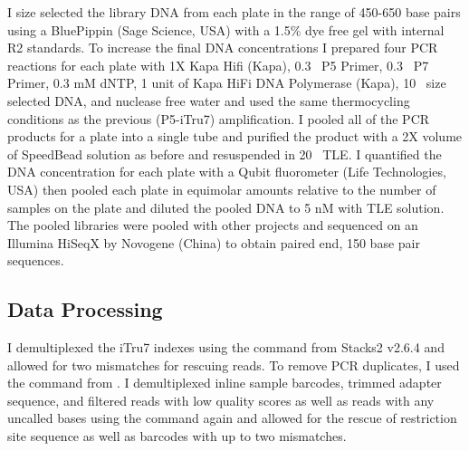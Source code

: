 I size selected the library DNA from each plate in the range of 450-650 base pairs using
a BluePippin (Sage Science, USA) with a 1.5\% dye free gel with internal R2 standards. 
To increase the final DNA concentrations I prepared four PCR reactions for each 
plate with 1X Kapa Hifi (Kapa), 0.3 \uM\ P5 Primer, 0.3 \uM\ P7 Primer, 0.3 mM dNTP, 
1 unit of Kapa HiFi DNA Polymerase (Kapa), 10 \uL\ size selected DNA, and 
nuclease free water and used the same thermocycling conditions as the previous
(P5-iTru7) amplification.
I pooled all of the PCR products for a plate into a single tube and purified 
the product with a 2X volume of SpeedBead solution as before and resuspended in 20 \uL\ TLE. 
I quantified the DNA concentration for each plate with a Qubit fluorometer 
(Life Technologies, USA) then pooled each plate in equimolar amounts relative 
to the number of samples on the plate and diluted the pooled DNA to 5 nM with
TLE solution. 
The pooled libraries were pooled with other projects and sequenced on an Illumina 
HiSeqX by Novogene (China) to obtain paired end, 150 base pair sequences. 

\subsection{Data Processing}

I demultiplexed the iTru7 indexes using the \processradtags command from 
Stacks2 v2.6.4 \parencites{rochette2019} and allowed for two mismatches for rescuing reads.
To remove PCR duplicates, I used the \clonefilter command from \stacks.
I demultiplexed inline sample barcodes, trimmed adapter sequence, and filtered 
reads with low quality scores as well as reads with any uncalled bases using the  
\processradtags command again and allowed for the rescue of restriction site sequence 
as well as barcodes with up to two mismatches.  






